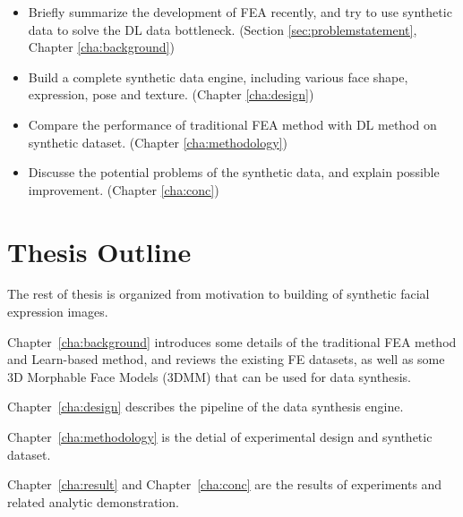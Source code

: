 \begin{itemize}
    \item Briefly summarize the development of FEA recently, and try to use synthetic data to solve the DL data bottleneck. (Section \ref{sec:problemstatement}, Chapter \ref{cha:background})
    \item Build a complete synthetic data engine, including various face shape, expression, pose and texture. (Chapter \ref{cha:design})
    \item Compare the performance of traditional FEA method with DL method on synthetic dataset. (Chapter \ref{cha:methodology})
    \item Discusse the potential problems of the synthetic data, and explain  possible improvement. (Chapter \ref{cha:conc})
\end{itemize}

\section{Thesis Outline}
\label{sec:outline}
The rest of thesis is organized from motivation to building of synthetic facial expression images.

Chapter~\ref{cha:background} introduces some details of the traditional FEA method and Learn-based method, and reviews the existing FE datasets, as well as some 3D Morphable Face Models (3DMM) that can be used for data synthesis.

Chapter~\ref{cha:design} describes the pipeline of the data synthesis engine.

Chapter~\ref{cha:methodology} is the detial of experimental design  and synthetic dataset.

Chapter~\ref{cha:result} and Chapter~\ref{cha:conc} are the results of experiments and related analytic demonstration.


